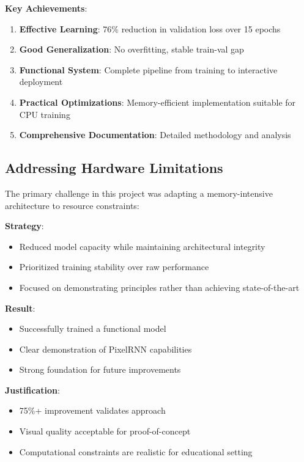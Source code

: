 \documentclass[12pt,a4paper]{article}
\begin{document}
\textbf{Key Achievements}:
\begin{enumerate}
    \item \textbf{Effective Learning}: 76\% reduction in validation loss over 15 epochs
    \item \textbf{Good Generalization}: No overfitting, stable train-val gap
    \item \textbf{Functional System}: Complete pipeline from training to interactive deployment
    \item \textbf{Practical Optimizations}: Memory-efficient implementation suitable for CPU training
    \item \textbf{Comprehensive Documentation}: Detailed methodology and analysis
\end{enumerate}

\subsection{Addressing Hardware Limitations}

The primary challenge in this project was adapting a memory-intensive architecture to resource constraints:

\textbf{Strategy}:
\begin{itemize}
    \item Reduced model capacity while maintaining architectural integrity
    \item Prioritized training stability over raw performance
    \item Focused on demonstrating principles rather than achieving state-of-the-art
\end{itemize}

\textbf{Result}:
\begin{itemize}
    \item Successfully trained a functional model
    \item Clear demonstration of PixelRNN capabilities
    \item Strong foundation for future improvements
\end{itemize}

\textbf{Justification}:
\begin{itemize}
    \item 75\%+ improvement validates approach
    \item Visual quality acceptable for proof-of-concept
    \item Computational constraints are realistic for educational setting
\end{itemize}
\end{document}
